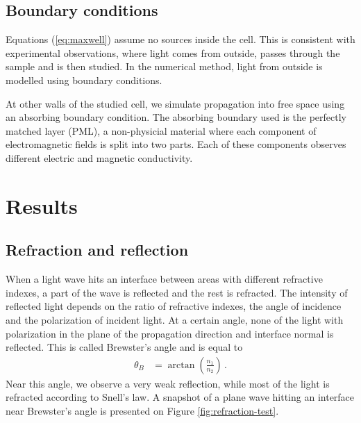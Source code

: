 \documentclass[a4paper,10pt]{article}
\renewenvironment{figure}
  {\par\medskip\noindent\minipage{\linewidth}}
  {\endminipage\par\medskip}
\begin{document}
\begin{multicols}{2}
\subsection{Boundary conditions}

Equations (\ref{eq:maxwell}) assume no sources inside the cell. 
This is consistent with experimental observations, where light comes from outside, passes through the sample and is then studied. 
In the numerical method, light from outside is modelled using boundary conditions. 

At other walls of the studied cell, we simulate propagation into free space using an absorbing boundary condition. 
The absorbing boundary used is the perfectly matched layer (\textsc{PML}), a non-physicial material where each component of electromagnetic fields is split into two parts. 
Each of these components observes different electric and magnetic conductivity. 

\section{Results}

\subsection{Refraction and reflection}

When a light wave hits an interface between areas with different refractive indexes, a part of the wave is reflected and the rest is refracted. 
The intensity of reflected light depends on the ratio of refractive indexes, the angle of incidence and the polarization of incident light. 
At a certain angle, none of the light with polarization in the plane of the propagation direction and interface normal is reflected. 
This is called Brewster's angle and is equal to
\begin{align}
 \theta_B &= \arctan\left(\frac{n_1}{n_2}\right)\,.
\end{align}
Near this angle, we observe a very weak reflection, while most of the light is refracted according to Snell's law. 
A snapshot of a plane wave hitting an interface near Brewster's angle is presented on Figure \ref{fig:refraction-test}. 

\begin{figure}
 \centering
  \vspace{-1.3cm}
 \resizebox{\textwidth}{!}{
  
 }
  \vspace{-1.6cm}
 \label{fig:refraction-test}
\end{figure}


\end{multicols}
\end{document}
